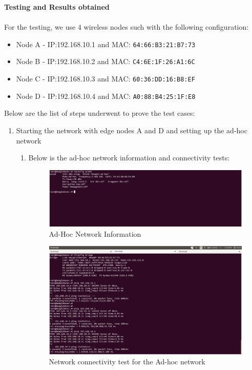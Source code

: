 \documentclass{article}
\begin{document}
\textbf{Testing and Results obtained}\\\ \\
For the testing, we use 4 wireless nodes such with the following configuration:
\begin{itemize}
\item Node A - IP:192.168.10.1 and MAC: \texttt{64:66:B3:21:B7:73}
\item Node B - IP:192.168.10.2 and MAC: \texttt{C4:6E:1F:26:A1:6C}
\item Node C - IP:192.168.10.3 and MAC: \texttt{60:36:DD:16:B8:EF}
\item Node D - IP:192.168.10.4 and MAC: \texttt{A0:88:B4:25:1F:E8}
\end{itemize}
Below are the list of steps underwent to prove the test cases: 
\begin{enumerate}
\item Starting the network with edge nodes A and D and setting up the ad-hoc network
\begin{enumerate}
\item Below is the ad-hoc network information and connectivity tests:%
\begin{figure}[H]
\caption{Ad-Hoc Network Information}
\centering
\includegraphics[width=\textwidth]{test_images/stats_node_1_iwconfig}
\end{figure}
\begin{figure}[H]
\caption{Network connectivity test for the Ad-hoc network}
\centering
\includegraphics[width=\textwidth]{test_images/stats_node_1}

\end{figure}
\end{enumerate}
\end{enumerate}
\end{document}
